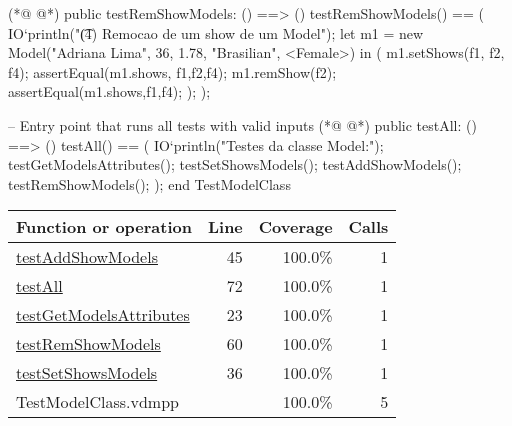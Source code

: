 \begin{vdmpp}[breaklines=true]
(*@
\label{testRemShowModels:60}
@*)
 public testRemShowModels: () ==> ()
 testRemShowModels() == (
    IO`println("\t (4) Remocao de um show de um Model");
    let m1 = new Model("Adriana Lima", 36, 1.78, "Brasilian", <Female>) in (
   m1.setShows({f1, f2, f4});
   assertEqual(m1.shows, {f1,f2,f4});
   m1.remShow(f2);
   assertEqual(m1.shows,{f1,f4});
   );
 );
 
 -- Entry point that runs all tests with valid inputs
(*@
\label{testAll:72}
@*)
  public testAll: () ==> ()
  testAll() == (
  IO`println("Testes da classe Model:");
   testGetModelsAttributes();
   testSetShowsModels();
   testAddShowModels();
   testRemShowModels();
  );
end TestModelClass
\end{vdmpp}
\bigskip
\begin{longtable}{|l|r|r|r|}
\hline
Function or operation & Line & Coverage & Calls \\
\hline
\hline
\hyperref[testAddShowModels:45]{testAddShowModels} & 45&100.0\% & 1 \\
\hline
\hyperref[testAll:72]{testAll} & 72&100.0\% & 1 \\
\hline
\hyperref[testGetModelsAttributes:23]{testGetModelsAttributes} & 23&100.0\% & 1 \\
\hline
\hyperref[testRemShowModels:60]{testRemShowModels} & 60&100.0\% & 1 \\
\hline
\hyperref[testSetShowsModels:36]{testSetShowsModels} & 36&100.0\% & 1 \\
\hline
\hline
TestModelClass.vdmpp & & 100.0\% & 5 \\
\hline
\end{longtable}


